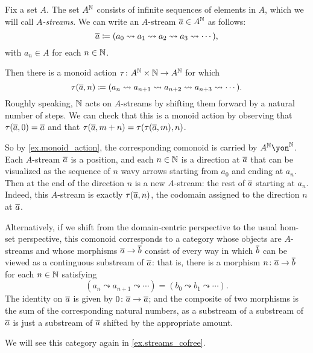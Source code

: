 \documentclass[Book-Poly]{subfiles}
\begin{document}
\begin{example}\label{ex.streams_category}
Fix a set $A$.
The set $A^{\mathbb{N}}$ consists of infinite sequences of elements in $A$, which we will call \emph{$A$-streams}.
We can write an $A$-stream $\overline{a}\in A^{\mathbb{N}}$ as follows:
\[
    \overline{a}\coloneqq(a_0\leadsto a_1\leadsto a_2\leadsto a_3\leadsto\cdots),
\]
with $a_n\in A$ for each $n\in\mathbb{N}$.

Then there is a monoid action $\tau\colon A^{\mathbb{N}}\times\mathbb{N}\to A^{\mathbb{N}}$ for which
\[
    \tau(\overline{a},n)\coloneqq(a_n\leadsto a_{n+1}\leadsto a_{n+2}\leadsto a_{n+3}\leadsto\cdots).
\]
Roughly speaking, $\mathbb{N}$ acts on $A$-streams by shifting them forward by a natural number of steps.
We can check that this is a monoid action by observing that $\tau(\overline{a},0)=\overline{a}$ and that $\tau(\overline{a},m+n)=\tau(\tau(\overline{a},m),n)$.

So by \cref{ex.monoid_action}, the corresponding comonoid is carried by $A^\nn\yon^\nn$.
Each $A$-stream $\overline{a}$ is a position, and each $n\in\mathbb{N}$ is a direction at $\overline{a}$ that can be visualized as the sequence of $n$ wavy arrows starting from $a_0$ and ending at $a_n$.
Then at the end of the direction $n$ is a new $A$-stream: the rest of $\overline{a}$ starting at $a_n$.
Indeed, this $A$-stream is exactly $\tau(\overline{a},n)$, the codomain assigned to the direction $n$ at $\overline{a}$.

Alternatively, if we shift from the domain-centric perspective to the usual hom-set perspective, this comonoid corresponds to a category whose objects are $A$-streams and whose morphisms $\overline{a}\to\overline{b}$ consist of every way in which $\overline{b}$ can be viewed as a continguous substream of $\overline{a}$: that is, there is a morphism $n\colon\overline{a}\to\overline{b}$ for each $n\in\mathbb{N}$ satisfying
\[
    (a_n\leadsto a_{n+1}\leadsto\cdots)=(b_0\leadsto b_1\leadsto\cdots).
\]
The identity on $\overline{a}$ is given by $0\colon\overline{a}\to\overline{a}$; and the composite of two morphisms is the sum of the corresponding natural numbers, as a substream of a substream of $\overline{a}$ is just a substream of $\overline{a}$ shifted by the appropriate amount.

We will see this category again in \cref{ex.streams_cofree}.
\end{example}

\end{document}
